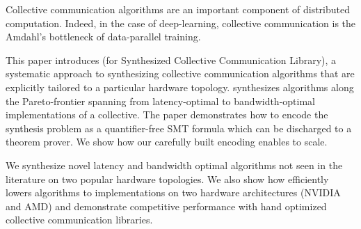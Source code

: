 Collective communication algorithms are an important component of
distributed computation.  Indeed, in the case of deep-learning,
collective communication is the Amdahl's bottleneck of data-parallel
training.   

This paper introduces \tool{} (for Synthesized Collective
Communication Library), a systematic approach to synthesizing collective
communication algorithms that are explicitly tailored to a particular
hardware topology.  \tool{} synthesizes algorithms along the
Pareto-frontier spanning from latency-optimal to bandwidth-optimal
implementations of a collective.  The paper demonstrates how to encode
the synthesis problem as a quantifier-free SMT formula which can be
discharged to a theorem prover. We show how our carefully built encoding enables
\tool{} to scale.

We synthesize novel latency and bandwidth optimal
algorithms not seen in the literature on two popular hardware
topologies. We also show how \tool{} efficiently lowers algorithms to
implementations on two hardware architectures (NVIDIA and AMD) and
demonstrate competitive performance with hand optimized collective
communication libraries. 
